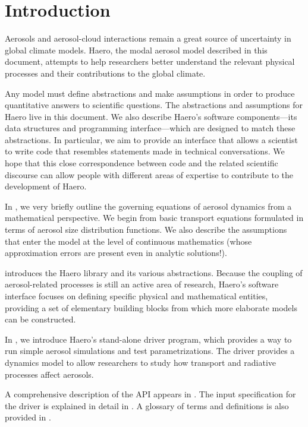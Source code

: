 \chapter{Introduction}

Aerosols and aerosol-cloud interactions remain a great source of uncertainty
in global climate models. Haero, the modal aerosol model described in this
document, attempts to help researchers better understand the relevant physical
processes and their contributions to the global climate.

Any model must define abstractions and make assumptions in order to produce
quantitative answers to scientific questions. The abstractions and assumptions
for Haero live in this document. We also describe Haero's software
components---its data structures and programming interface---which are designed
to match these abstractions. In particular, we aim to provide an interface that
allows a scientist to write code that resembles statements made in technical
conversations. We hope that this close correspondence between code and
the related scientific discourse can allow people with different areas of
expertise to contribute to the development of Haero.

In , we very briefly outline the governing equations of
aerosol dynamics from a mathematical perspective. We begin from basic transport
equations formulated in terms of aerosol size distribution functions. We also
describe the assumptions that enter the model at the level of continuous
mathematics (whose approximation errors are present even in analytic
solutions!).

 introduces the Haero library and its various abstractions.
Because the coupling of aerosol-related processes is still an active area of
research, Haero's software interface focuses on defining specific physical and
mathematical entities, providing a set of elementary building blocks from which
more elaborate models can be constructed.

In , we introduce Haero's stand-alone driver program, which
provides a way to run simple aerosol simulations and test parametrizations.
The driver provides a dynamics model to allow researchers to study how transport
and radiative processes affect aerosols.

A comprehensive description of the API appears in . The input
specification for the driver is explained in detail in .
A glossary of terms and definitions is also provided in .

